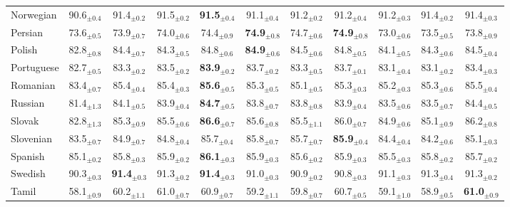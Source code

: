 \begin{table*}[ht]
{\begin{tabular}{lcccccccccc}
Norwegian & 90.6$_{\pm 0.4}$ & 91.4$_{\pm 0.2}$ & 91.5$_{\pm 0.2}$ & \textbf{91.5}$_{\pm 0.4}$ & 91.1$_{\pm 0.4}$ & 91.2$_{\pm 0.2}$ & 91.2$_{\pm 0.4}$ & 91.2$_{\pm 0.3}$ & 91.4$_{\pm 0.2}$ & 91.4$_{\pm 0.3}$ \\
Persian & 73.6$_{\pm 0.5}$ & 73.9$_{\pm 0.7}$ & 74.0$_{\pm 0.6}$ & 74.4$_{\pm 0.9}$ & \textbf{74.9}$_{\pm 0.8}$ & 74.7$_{\pm 0.6}$ & \textbf{74.9}$_{\pm 0.8}$ & 73.0$_{\pm 0.6}$ & 73.5$_{\pm 0.5}$ & 73.8$_{\pm 0.9}$ \\
Polish & 82.8$_{\pm 0.8}$ & 84.4$_{\pm 0.7}$ & 84.3$_{\pm 0.5}$ & 84.8$_{\pm 0.6}$ & \textbf{84.9}$_{\pm 0.6}$ & 84.5$_{\pm 0.6}$ & 84.8$_{\pm 0.5}$ & 84.1$_{\pm 0.5}$ & 84.3$_{\pm 0.6}$ & 84.5$_{\pm 0.4}$ \\
Portuguese & 82.7$_{\pm 0.5}$ & 83.3$_{\pm 0.2}$ & 83.5$_{\pm 0.2}$ & \textbf{83.9}$_{\pm 0.2}$ & 83.7$_{\pm 0.2}$ & 83.3$_{\pm 0.5}$ & 83.7$_{\pm 0.1}$ & 83.1$_{\pm 0.4}$ & 83.1$_{\pm 0.2}$ & 83.4$_{\pm 0.3}$ \\
Romanian & 83.4$_{\pm 0.7}$ & 85.4$_{\pm 0.4}$ & 85.4$_{\pm 0.3}$ & \textbf{85.6}$_{\pm 0.5}$ & 85.3$_{\pm 0.5}$ & 85.1$_{\pm 0.5}$ & 85.3$_{\pm 0.3}$ & 85.2$_{\pm 0.3}$ & 85.3$_{\pm 0.6}$ & 85.5$_{\pm 0.4}$ \\
Russian & 81.4$_{\pm 1.3}$ & 84.1$_{\pm 0.5}$ & 83.9$_{\pm 0.4}$ & \textbf{84.7}$_{\pm 0.5}$ & 83.8$_{\pm 0.7}$ & 83.8$_{\pm 0.8}$ & 83.9$_{\pm 0.4}$ & 83.5$_{\pm 0.6}$ & 83.5$_{\pm 0.7}$ & 84.4$_{\pm 0.5}$ \\
Slovak & 82.8$_{\pm 1.3}$ & 85.3$_{\pm 0.9}$ & 85.5$_{\pm 0.6}$ & \textbf{86.6}$_{\pm 0.7}$ & 85.6$_{\pm 0.8}$ & 85.5$_{\pm 1.1}$ & 86.0$_{\pm 0.7}$ & 84.9$_{\pm 0.6}$ & 85.1$_{\pm 0.9}$ & 86.2$_{\pm 0.8}$ \\
Slovenian & 83.5$_{\pm 0.7}$ & 84.9$_{\pm 0.7}$ & 84.8$_{\pm 0.4}$ & 85.7$_{\pm 0.4}$ & 85.8$_{\pm 0.7}$ & 85.7$_{\pm 0.7}$ & \textbf{85.9}$_{\pm 0.4}$ & 84.4$_{\pm 0.4}$ & 84.2$_{\pm 0.6}$ & 85.1$_{\pm 0.3}$ \\
Spanish & 85.1$_{\pm 0.2}$ & 85.8$_{\pm 0.3}$ & 85.9$_{\pm 0.2}$ & \textbf{86.1}$_{\pm 0.3}$ & 85.9$_{\pm 0.3}$ & 85.6$_{\pm 0.2}$ & 85.9$_{\pm 0.3}$ & 85.5$_{\pm 0.3}$ & 85.8$_{\pm 0.2}$ & 85.7$_{\pm 0.2}$ \\
Swedish & 90.3$_{\pm 0.3}$ & \textbf{91.4}$_{\pm 0.3}$ & 91.3$_{\pm 0.2}$ & \textbf{91.4}$_{\pm 0.3}$ & 91.0$_{\pm 0.3}$ & 90.9$_{\pm 0.2}$ & 90.8$_{\pm 0.3}$ & 91.1$_{\pm 0.3}$ & 91.3$_{\pm 0.4}$ & 91.3$_{\pm 0.2}$ \\
Tamil & 58.1$_{\pm 0.9}$ & 60.2$_{\pm 1.1}$ & 61.0$_{\pm 0.7}$ & 60.9$_{\pm 0.7}$ & 59.2$_{\pm 1.1}$ & 59.8$_{\pm 0.7}$ & 60.7$_{\pm 0.5}$ & 59.1$_{\pm 1.0}$ & 58.9$_{\pm 0.5}$ & \textbf{61.0}$_{\pm 0.9}$ \\

\end{tabular}}
\end{table*}
